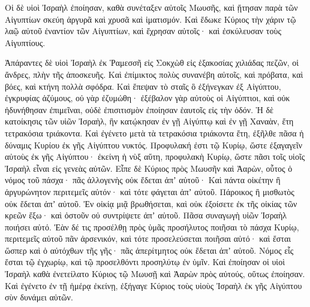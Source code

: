 {Οἱ δὲ υἱοὶ Ἰσραὴλ ἐποίησαν, καθὰ συνέταξεν αὐτοῖς Μωυσῆς, καὶ ᾔτησαν παρὰ τῶν Αἰγυπτίων σκεύη ἀργυρᾶ καὶ χρυσᾶ καὶ ἱματισμόν.
Καὶ ἔδωκε Κύριος τὴν χάριν τῷ λαῷ αὐτοῦ ἐναντίον τῶν Αἰγυπτίων, καὶ ἔχρησαν αὐτοῖς· καὶ ἐσκύλευσαν τοὺς Αἰγυπτίους.
\par }{\PP {}Ἀπάραντες δὲ υἱοὶ Ἰσραὴλ ἐκ Ῥαμεσσῆ εἰς Σοκχὼθ εἰς ἑξακοσίας χιλιάδας πεζῶν, οἱ ἄνδρες, πλὴν τῆς ἀποσκευῆς.
Καὶ ἐπίμικτος πολὺς συνανέβη αὐτοῖς, καὶ πρόβατα, καὶ βόες, καὶ κτήνη πολλὰ σφόδρα.
Καὶ ἔπεψαν τὸ σταῖς ὃ ἐξήνεγκαν ἐξ Αἰγύπτου, ἐγκρυφίας ἀζύμους, οὐ γὰρ ἐζυμώθη· ἐξέβαλον γὰρ αὐτοὺς οἱ Αἰγύπτιοι, καὶ οὐκ ἠδυνήθησαν ἐπιμεῖναι, οὐδὲ ἐπισιτισμὸν ἐποίησαν ἑαυτοῖς εἰς τὴν ὁδόν.
Ἡ δὲ κατοίκησις τῶν υἱῶν Ἰσραὴλ, ἣν κατῴκησαν ἐν γῇ Αἰγύπτῳ καὶ ἐν γῇ Χαναὰν, ἔτη τετρακόσια τριάκοντα.
Καὶ ἐγένετο μετὰ τὰ τετρακόσια τριάκοντα ἔτη, ἐξῆλθε πᾶσα ἡ δύναμις Κυρίου ἐκ γῆς Αἰγύπτου νυκτός.
Προφυλακή ἐστι τῷ Κυρίῳ, ὥστε ἐξαγαγεῖν αὐτοὺς ἐκ γῆς Αἰγύπτου· ἐκείνη ἡ νὺξ αὕτη, προφυλακὴ Κυρίῳ, ὥστε πᾶσι τοῖς υἱοῖς Ἰσραὴλ εἶναι εἰς γενεὰς αὐτῶν.
Εἶπε δὲ Κύριος πρὸς Μωυσῆν καὶ Ἀαρὼν, οὗτος ὁ νόμος τοῦ πάσχα· πᾶς ἀλλογενὴς οὐκ ἔδεται ἀπʼ αὐτοῦ·
Καὶ πάντα οἰκέτην ἢ ἀργυρώνητον περιτεμεῖς αὐτόν· καὶ τότε φάγεται ἀπʼ αὐτοῦ.
Πάροικος ἢ μισθωτὸς οὐκ ἔδεται ἀπʼ αὐτοῦ.
Ἐν οἰκίᾳ μιᾷ βρωθήσεται, καὶ οὐκ ἐξοίσετε ἐκ τῆς οἰκίας τῶν κρεῶν ἔξω· καὶ ὀστοῦν οὐ συντρίψετε ἀπʼ αὐτοῦ.
Πᾶσα συναγωγὴ υἱῶν Ἰσραὴλ ποιήσει αὐτό.
Ἐὰν δέ τις προσέλθῃ πρὸς ὑμᾶς προσήλυτος ποιῆσαι τὸ πάσχα Κυρίῳ, περιτεμεῖς αὐτοῦ πᾶν ἀρσενικόν, καὶ τότε προσελεύσεται ποιῆσαι αὐτό· καὶ ἔσται ὥσπερ καὶ ὁ αὐτόχθων τῆς γῆς· πᾶς ἀπερίτμητος οὐκ ἔδεται ἀπʼ αὐτοῦ.
Νόμος εἷς ἔσται τῷ ἐγχωρίῳ, καὶ τῷ προσελθόντι προσηλύτῳ ἐν ὑμῖν.
Καὶ ἐποίησαν οἱ υἱοὶ Ἰσραὴλ καθὰ ἐνετείλατο Κύριος τῷ Μωυσῇ καὶ Ἀαρὼν πρὸς αὐτούς, οὕτως ἐποίησαν.
Καὶ ἐγένετο ἐν τῇ ἡμέρᾳ ἐκείνῃ, ἐξήγαγε Κύριος τοὺς υἱοὺς Ἰσραὴλ ἐκ γῆς Αἰγύπτου σὺν δυνάμει αὐτῶν.

}
